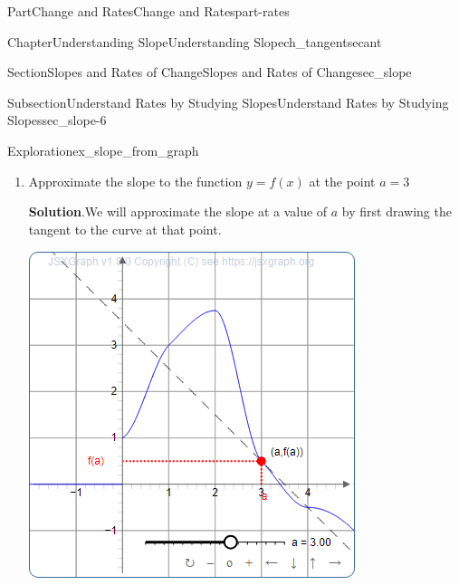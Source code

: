 \documentclass[oneside,10pt,]{tufte-book}
\newcommand{\blocktitlefont}{\relax}
\numberwithin{equation}{chapter}
\begin{document}
\begin{partptx}{Part}{Change and Rates}{}{Change and Rates}{}{}{part-rates}
\begin{chapterptx}{Chapter}{Understanding Slope}{}{Understanding Slope}{}{}{ch_tangentsecant}
\begin{sectionptx}{Section}{Slopes and Rates of Change}{}{Slopes and Rates of Change}{}{}{sec_slope}
\begin{subsectionptx}{Subsection}{Understand Rates by Studying Slopes}{}{Understand Rates by Studying Slopes}{}{}{sec_slope-6}
\begin{exploration}{Exploration}{}{ex_slope_from_graph}
\begin{enumerate}[font=\bfseries,label=(\alph*),ref=\alph*]
\begin{equation*}
m = \dfrac{3.75-3.75}{2-0} = \dfrac{0}{2} = 0
\end{equation*}
Therefore, the slope of \(f(x)\) at \(a=2\) is equal to 0.%
\item{}Approximate the slope to the function \(y=f(x)\) at the point \(a=3\)%
\par\smallskip%
\noindent\textbf{\blocktitlefont Solution}.\hypertarget{ex_slope_from_graph-4-2}{}\quad{}We will approximate the slope at a value of \(a\) by first drawing the tangent to the curve at that point.%
\begin{sidebyside}{2}{0.075}{0.075}{0.17}%
\begin{sbspanel}{0.47}%
\includegraphics[width=\linewidth]{generated/preview/ex_slope_from_graph-4-2-2-preview.png}
\end{sbspanel}%
\begin{sbspanel}{0.21}%

\end{sbspanel}
\end{sidebyside}
\end{enumerate}
\end{exploration}
\end{subsectionptx}
\end{sectionptx}
\end{chapterptx}
\end{partptx}
\end{document}
